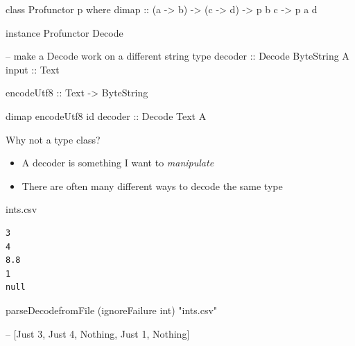 \documentclass[UKenglish,usenames,dvipsnames,svgnames,table,aspectratio=169,mathserif]{beamer}
\newcommand{\nl}{\vspace{\baselineskip}}
\newcommand{\pnl}{\pause \nl}
\begin{document}
\begin{frame}[fragile]
\begin{haskellcode}
class Profunctor p where
  dimap :: (a -> b) -> (c -> d) -> p b c -> p a d

instance Profunctor Decode
\end{haskellcode}
\pnl
\begin{haskellcode}
-- make a Decode work on a different string type
decoder :: Decode ByteString A
input :: Text
\end{haskellcode}
\pause
\begin{haskellcode}
encodeUtf8 :: Text -> ByteString
\end{haskellcode}
\pause
\begin{haskellcode}
dimap encodeUtf8 id decoder :: Decode Text A
\end{haskellcode}
\end{frame}


\begin{frame}

{\Large Why not a type class?}


\begin{itemize}
\item A decoder is something I want to {\it manipulate}
\item There are often many different ways to decode the same type
\end{itemize}

\end{frame}


\begin{frame}[fragile]

\pnl

\begin{block}{ints.csv}
\begin{Verbatim}
3
4
8.8
1
null
\end{Verbatim}
\end{block}

\pnl
\begin{haskellcode}
parseDecodefromFile (ignoreFailure int) "ints.csv"

-- [Just 3, Just 4, Nothing, Just 1, Nothing]
\end{haskellcode}

\end{frame}
\end{document}
